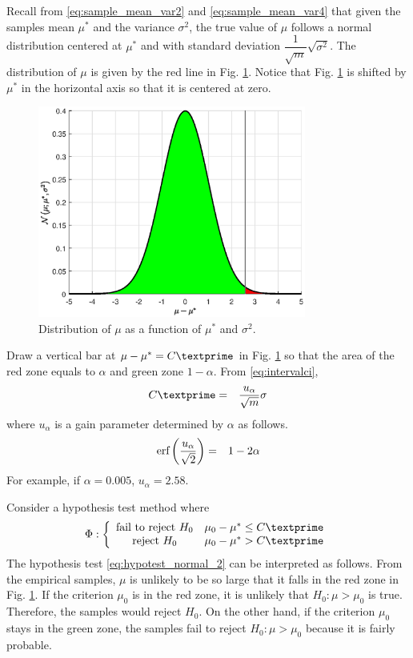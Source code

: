 Recall from \eqref{eq:sample_mean_var2} and \eqref{eq:sample_mean_var4} that given the samples mean $\mu^*$ and the variance $\sigma^2$, the true value of $\mu$ follows a normal distribution centered at $\mu^*$ and with standard deviation $\dfrac{1}{\sqrt{m}}\sqrt{\sigma^2}$. The distribution of $\mu$ is given by the red line in Fig. \ref{ch:hypothesis_normal_mean}. Notice that Fig. \ref{ch:hypothesis_normal_mean} is shifted by $\mu^*$ in the horizontal axis so that it is centered at zero.
\begin{figure}[!htb]
	\centering
	\includegraphics[width=250pt]{chapters/part-2/figures/hypothesis_normal_mean.eps}
	\caption{Distribution of $\mu$ as a function of $\mu^*$ and $\sigma^2$.} \label{ch:hypothesis_normal_mean}
\end{figure}

Draw a vertical bar at $\mu-\mu^*=C\textprime$ in Fig. \ref{ch:hypothesis_normal_mean} so that the area of the red zone equals to $\alpha$ and green zone $1-\alpha$. From \eqref{eq:intervalci},
\begin{eqnarray}
	C\textprime &=& \dfrac{u_\alpha}{\sqrt{m}}\sigma \nonumber
\end{eqnarray}
where $u_\alpha$ is a gain parameter determined by $\alpha$ as follows.
\begin{eqnarray}
	\textup{erf}\left(\dfrac{u_\alpha}{\sqrt{2}}\right) &=& 1-2\alpha \nonumber
\end{eqnarray}
For example, if $\alpha = 0.005$, $u_\alpha=2.58$. 

Consider a hypothesis test method where
\begin{eqnarray}
	\Phi : \left\{\begin{array}{cc}
		\textup{fail to reject~} H_0 & \mu_0 - \mu^* \leq C\textprime \\
		\textup{reject~} H_0 & \mu_0 - \mu^* > C\textprime
	\end{array}\right. \label{eq:hypotest_normal_2}
\end{eqnarray}
The hypothesis test \eqref{eq:hypotest_normal_2} can be interpreted as follows. From the empirical samples, $\mu$ is unlikely to be so large that it falls in the red zone in Fig. \ref{ch:hypothesis_normal_mean}. If the criterion $\mu_0$ is in the red zone, it is unlikely that $H_0: \mu > \mu_0$ is true. Therefore, the samples would reject $H_0$. On the other hand, if the criterion $\mu_0$ stays in the green zone, the samples fail to reject $H_0: \mu > \mu_0$ because it is fairly probable. 

